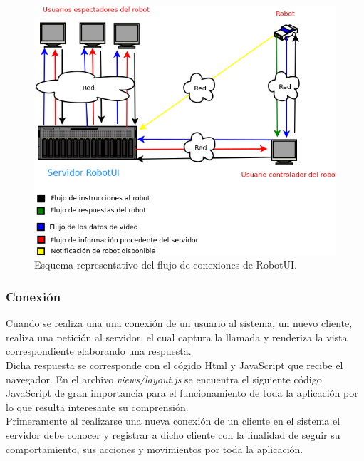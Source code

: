 \begin{figure}[H]
  \begin{center}
    \includegraphics[scale=0.5]{diagramas/flujo-comunicaciones.png}
  \end{center}
  \caption{Esquema representativo del flujo de conexiones de RobotUI.}
  \label{diagram:conexiones}
\end{figure}

\subsubsection{ Conexión }
\label{sec:conexion}


Cuando se realiza una una conexión de un usuario al sistema, un nuevo cliente, realiza una petición al servidor, el cual captura la llamada y renderiza la vista correspondiente elaborando una respuesta.\\

Dicha respuesta se corresponde con el cógido Html y JavaScript que recibe el navegador. En el archivo \emph{views/layout.js} se encuentra el siguiente código JavaScript de gran importancia
para el funcionamiento de toda la aplicación por lo que resulta interesante su comprensión.\\

Primeramente al realizarse una nueva conexión de un cliente en el sistema el servidor debe conocer y registrar a dicho cliente con la finalidad de seguir su comportamiento, sus acciones y 
movimientos por toda la aplicación.\\

